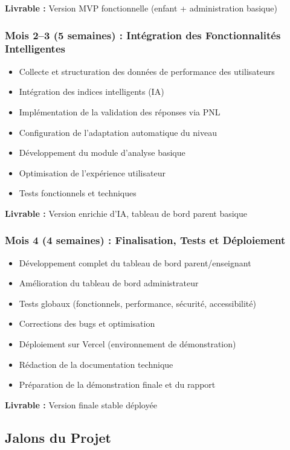 \documentclass[12pt,a4paper]{article}
\begin{document}
\textbf{Livrable :} Version MVP fonctionnelle (enfant + administration basique)

\subsubsection{Mois 2--3 (5 semaines) : Intégration des Fonctionnalités Intelligentes}

\begin{itemize}
    \item Collecte et structuration des données de performance des utilisateurs
    \item Intégration des indices intelligents (IA)
    \item Implémentation de la validation des réponses via PNL
    \item Configuration de l'adaptation automatique du niveau
    \item Développement du module d'analyse basique
    \item Optimisation de l'expérience utilisateur
    \item Tests fonctionnels et techniques
\end{itemize}

\textbf{Livrable :} Version enrichie d'IA, tableau de bord parent basique

\subsubsection{Mois 4 (4 semaines) : Finalisation, Tests et Déploiement}

\begin{itemize}
    \item Développement complet du tableau de bord parent/enseignant
    \item Amélioration du tableau de bord administrateur
    \item Tests globaux (fonctionnels, performance, sécurité, accessibilité)
    \item Corrections des bugs et optimisation
    \item Déploiement sur Vercel (environnement de démonstration)
    \item Rédaction de la documentation technique
    \item Préparation de la démonstration finale et du rapport
\end{itemize}

\textbf{Livrable :} Version finale stable déployée

\subsection{Jalons du Projet}
\end{document}
